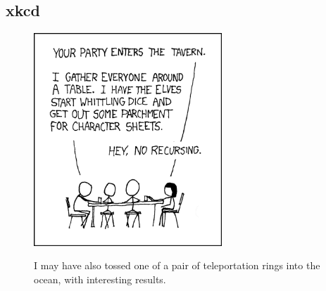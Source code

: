 \documentclass{beamer}
\begin{document}
\subsection{xkcd}
\begin{frame}[plain]
  \begin{figure}
    \begin{center}
      \includegraphics[width=200pt]{tabletop_roleplaying}
    \end{center}
    {\tiny I may have also tossed one of a pair of teleportation rings into the ocean, with interesting results.}
  \end{figure}
\end{frame}
\end{document}
